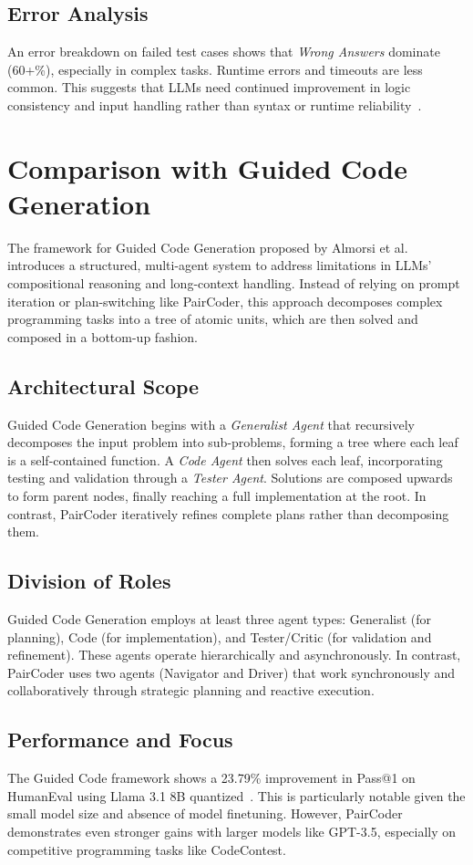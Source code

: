 \documentclass[11pt,a4paper]{article}
\begin{document}
\subsection{Error Analysis}
An error breakdown on failed test cases shows that \textit{Wrong Answers} dominate (60+\%), especially in complex tasks. Runtime errors and timeouts are less common. This suggests that LLMs need continued improvement in logic consistency and input handling rather than syntax or runtime reliability~\cite{zhang2024paircoder}.

\section{Comparison with Guided Code Generation}
The framework for Guided Code Generation proposed by Almorsi et al.\cite{almorsi2025guided} introduces a structured, multi-agent system to address limitations in LLMs' compositional reasoning and long-context handling. Instead of relying on prompt iteration or plan-switching like PairCoder, this approach decomposes complex programming tasks into a tree of atomic units, which are then solved and composed in a bottom-up fashion.

\subsection{Architectural Scope}
Guided Code Generation begins with a \textit{Generalist Agent} that recursively decomposes the input problem into sub-problems, forming a tree where each leaf is a self-contained function. A \textit{Code Agent} then solves each leaf, incorporating testing and validation through a \textit{Tester Agent}. Solutions are composed upwards to form parent nodes, finally reaching a full implementation at the root. In contrast, PairCoder iteratively refines complete plans rather than decomposing them.

\subsection{Division of Roles}
Guided Code Generation employs at least three agent types: Generalist (for planning), Code (for implementation), and Tester/Critic (for validation and refinement). These agents operate hierarchically and asynchronously. In contrast, PairCoder uses two agents (Navigator and Driver) that work synchronously and collaboratively through strategic planning and reactive execution.

\subsection{Performance and Focus}
The Guided Code framework shows a 23.79\% improvement in Pass@1 on HumanEval using Llama 3.1 8B quantized~\cite{almorsi2025guided}. This is particularly notable given the small model size and absence of model finetuning. However, PairCoder demonstrates even stronger gains with larger models like GPT-3.5, especially on competitive programming tasks like CodeContest.
\end{document}
